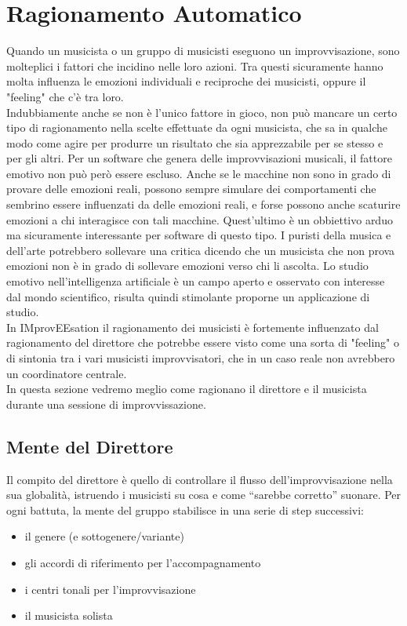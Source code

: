 \section{Ragionamento Automatico}
Quando un musicista o un gruppo di musicisti eseguono un
improvvisazione, sono molteplici i fattori che incidino nelle loro azioni. 
Tra questi sicuramente hanno molta influenza le emozioni
individuali e reciproche dei musicisti, oppure il "feeling" che c'è tra
loro.\\
Indubbiamente anche se non è l'unico fattore in gioco, 
non può mancare un certo tipo di ragionamento
nella scelte effettuate da ogni musicista, che sa in qualche modo come
agire per produrre un risultato che sia apprezzabile per se stesso e per gli
altri. Per un software che genera delle improvvisazioni musicali, il fattore 
emotivo non può però essere escluso. Anche se le macchine non sono in grado
di provare delle emozioni reali, possono sempre simulare dei
comportamenti che sembrino essere influenzati da delle emozioni reali, e
forse possono anche scaturire emozioni a chi interagisce con tali
macchine. Quest'ultimo è un obbiettivo arduo ma sicuramente interessante
per software di questo tipo. I puristi della musica e dell'arte
potrebbero sollevare una critica dicendo che un musicista che non prova
emozioni non è in grado di sollevare emozioni verso chi li ascolta.
Lo studio emotivo nell'intelligenza artificiale è un campo aperto e
osservato con interesse dal mondo scientifico, risulta quindi stimolante
proporne un applicazione di studio.\\
In IMprovEEsation il ragionamento dei musicisti è fortemente influenzato
dal ragionamento del direttore che potrebbe essere visto come una sorta
di "feeling" o di sintonia tra i vari musicisti improvvisatori, che in
un caso reale non avrebbero un coordinatore centrale.\\
In questa sezione vedremo meglio come ragionano il direttore e il
musicista durante una sessione di improvvissazione.
\label{thinking}
\subsection{Mente del Direttore}
Il compito del direttore è quello di controllare il flusso dell'improvvisazione nella sua globalità, istruendo i musicisti su cosa e come ``sarebbe corretto'' suonare. 
Per ogni battuta, la mente del gruppo stabilisce in una serie di step successivi:
\begin{itemize}
\item il genere (e sottogenere/variante)
\item gli accordi di riferimento per l'accompagnamento
\item i centri tonali per l'improvvisazione
\item il musicista solista
\end{itemize}

